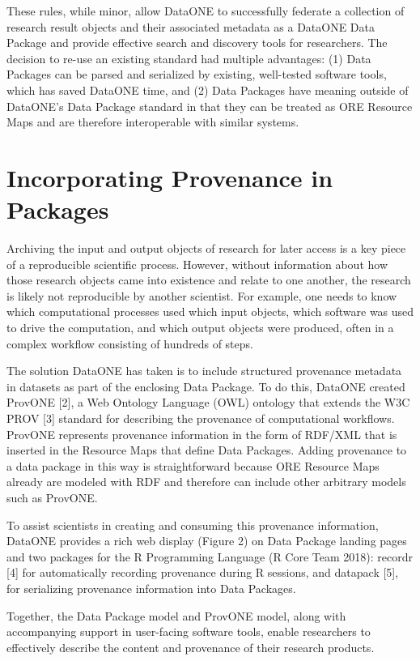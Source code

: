 \documentclass[conference]{IEEEtran}
\begin{document}
These rules, while minor, allow DataONE to successfully federate a collection of research result objects and their associated metadata as a DataONE Data Package and provide effective search and discovery tools for researchers. The decision to re-use an existing standard had multiple advantages: (1) Data Packages can be parsed and serialized by existing, well-tested software tools, which has saved DataONE time, and (2) Data Packages have meaning outside of DataONE’s Data Package standard in that they can be treated as ORE Resource Maps and are therefore interoperable with similar systems.

\section{Incorporating Provenance in Packages}

Archiving the input and output objects of research for later access is a key piece of a reproducible scientific process. However, without information about how those research objects came into existence and relate to one another, the research is likely not reproducible by another scientist. For example, one needs to know which computational processes used which input objects, which software was used to drive the computation, and which output objects were produced, often in a complex workflow consisting of hundreds of steps.


The solution DataONE has taken is to include structured provenance metadata in datasets as part of the enclosing Data Package. To do this, DataONE created ProvONE [2], a Web Ontology Language (OWL) ontology that extends the W3C PROV [3] standard for describing the provenance of computational workflows. ProvONE represents provenance information in the form of RDF/XML that is inserted in the Resource Maps that define Data Packages. Adding provenance to a data package in this way is straightforward because ORE Resource Maps already are modeled with RDF and therefore can include other arbitrary models such as ProvONE.

To assist scientists in creating and consuming this provenance information, DataONE provides a rich web display (Figure 2) on Data Package landing pages and two packages for the R Programming Language (R Core Team 2018): recordr [4] for automatically recording provenance during R sessions, and datapack [5], for serializing provenance information into Data Packages.

Together, the Data Package model and ProvONE model, along with accompanying support in user-facing software tools, enable researchers to effectively describe the content and provenance of their research products.
\end{document}
